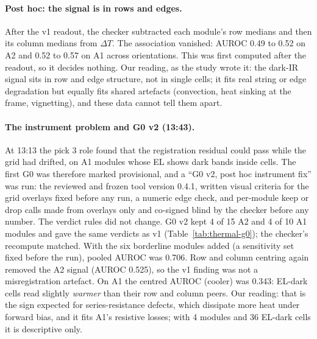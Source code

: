 \paragraph{Post hoc: the signal is in rows and edges.} After the v1 readout, the checker subtracted each module's row medians and then
its column medians from $\Delta T$. The association vanished: AUROC 0.49 to 0.52 on A2 and 0.52 to 0.57 on A1 across orientations.
This was first computed after the readout, so it decides nothing. Our reading, as the study wrote it: the dark-IR signal sits in row
and edge structure, not in single cells; it fits real string or edge degradation but equally fits shared artefacts (convection,
heat sinking at the frame, vignetting), and these data cannot tell them apart.

\paragraph{The instrument problem and G0 v2 (13:43).} At 13:13 the pick 3 role found that the registration residual could pass while
the grid had drifted, on A1 modules whose EL shows dark bands inside cells. The first G0 was therefore marked provisional, and a
``G0 v2, post hoc instrument fix'' was run: the reviewed and frozen tool version 0.4.1, written visual criteria for the grid overlays
fixed before any run, a numeric edge check, and per-module keep or drop calls made from overlays only and co-signed blind by the
checker before any number. The verdict rules did not change. G0 v2 kept 4 of 15 A2 and 4 of 10 A1 modules and gave the same verdicts
as v1 (Table~\ref{tab:thermal-g0}); the checker's recompute matched. With the six borderline modules added (a sensitivity set fixed
before the run), pooled AUROC was 0.706. Row and column centring again removed the A2 signal (AUROC 0.525), so the v1 finding was not a
misregistration artefact. On A1 the centred AUROC (cooler) was 0.343: EL-dark cells read slightly \emph{warmer} than their row and
column peers. Our reading: that is the sign expected for series-resistance defects, which dissipate more heat under forward bias, and it
fits A1's resistive losses; with 4 modules and 36 EL-dark cells it is descriptive only.


